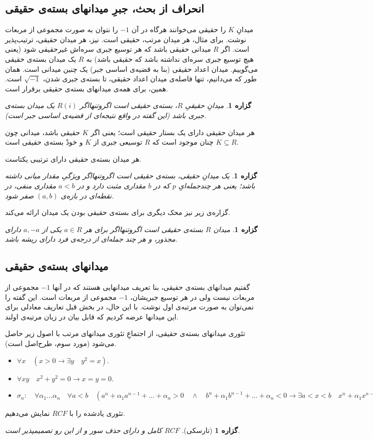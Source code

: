 \documentclass[12pt,a4paper]{report}
\theoremstyle{colorhead}
\newtheorem{prop}[thm]{گزاره}
\begin{document}
\subsection{	انحراف از بحث، جبرِ میدانهای بسته‌ی حقیقی}
میدانِ
$K$
را حقیقی می‌خوانند هرگاه در آن
$-1$
را نتوان به صورت مجموعی از مربعات نوشت. برای مثال، هر میدان مرتب، حقیقی است.
نیز، هر میدان حقیقی، ترتیب‌پذیر است. 
 اگر
$R$
میدانی حقیقی باشد که هر توسیع جبری سره‌اش غیرحقیقی شود
(یعنی هیچ توسیع‌ جبری‌ سره‌ای نداشته باشد که حقیقی باشد)
به
$R$
یک میدان بسته‌ی حقیقی می‌گوییم. میدان اعداد حقیقی 
(بنا به قضیه‌ی اساسی جبر)
 یک چنین میدانی است.
همان طور که می‌دانیم، تنها فاصله‌ی میدان اعداد حقیقی، تا بسته‌ی جبری شدن، 
$\sqrt{-1}$
است. همین، برای همه‌ی میدانهای بسته‌ی حقیقی برقرار است.
\begin{prop}
میدانِ حقیقیِ
$R$،
بسته‌ی حقیقی است اگروتنهااگر
$R(i)$
یک میدان بسته‌ی جبری باشد (این گفته در واقع نتیجه‌ای از قضیه‌ی اساسی جبر است).
\end{prop}
\par
هر میدان حقیقی دارای یک بستار حقیقی است؛‌ یعنی اگر
$K$
حقیقی باشد، میدانی چون
$K\subseteq R$
چنان موجود است که 
$R$
توسیعی جبری از
$K$
و خودْ بسته‌ی حقیقی است. 
\par 
هر میدان بسته‌ی حقیقی دارای ترتیبی یکتاست.  
\begin{prop}
یک میدانِ حقیقی، بسته‌ی حقیقی است اگروتنهااگر ویژگیِ مقدار میانی داشته باشد؛ یعنی هر چندجمله‌ایِ
$p$
که در 
$b$
مقداری مثبت دارد و در
$a<b$
مقداری منفی، در نقطه‌ای در بازه‌ی
$(a,b)$
صفر شود.
\end{prop}
گزاره‌ی زیر نیز محک دیگری برای بسته‌ی حقیقی بودن یک میدان ارائه می‌کند.
\begin{prop}
میدان
$R$
بسته‌ی حقیقی است اگروتنهااگر برای
هر
$a\in R$
یکی از
$a,-a$
دارای مجذور، و هر چند جمله‌ای از درجه‌ی فرد دارای ریشه باشد.
\end{prop}
\subsection{میدانهای بسته‌ی حقیقی}
گفتیم میدانهای بسته‌ی حقیقی، بنا تعریف میدانهایی هستند که در آنها
$-1$
مجموعی از مربعات نیست 
ولی در هر توسیع جبریشان،
$-1$
مجموعی از مربعات است. این گفته را نمی‌توان به صورت مرتبه‌ی اول نوشت. با این حال، در بخش قبل تعاریف معادلی برای این میدانها عرضه کردیم که قابل
بیان در زبان مرتبه‌ی اولند.
\par 
تئوری میدانهای بسته‌ی حقیقی، از اجتماعِ تئوری میدانهای مرتب با اصول زیر حاصل می‌شود (مورد سوم، طرح‌اصل است).
\begin{itemize}
\item 
$\forall x\quad (x>0\to \exists y \quad y^2=x)$.
\item 
$\forall xy \quad x^2+y^2=0\to x=y=0$.
\item 
$\sigma_n:\quad \forall \alpha_1\ldots \alpha_n \quad \forall a<b
\quad (a^n+\alpha_1a^{n-1}+\ldots+\alpha_n>0 \quad \wedge \quad
b^n+\alpha_1b^{n-1}+\ldots+\alpha_n<0\to 
\exists a<x<b\quad x^n+\alpha_1x^{n-1}+\ldots +\alpha_n=0)$
\end{itemize}
تئوری یادشده را با
$RCF$
نمایش می‌دهیم.
\begin{prop}[تارسکی]
$RCF$
کامل و دارای حذف سور و از این رو تصمیمپذیر است.
\end{prop}
\end{document}
